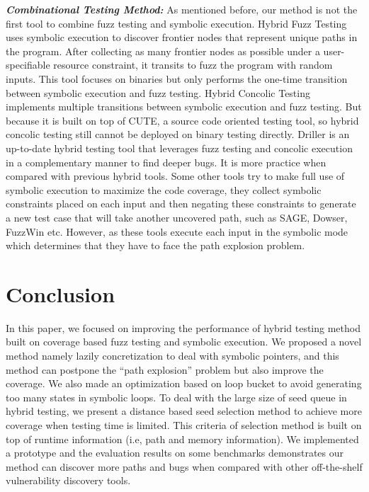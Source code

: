 \documentclass[a4paper]{article}
\begin{document}
\noindent\textit{\textbf{Combinational Testing Method:}}
As mentioned before, our method is not the first tool to combine fuzz testing and symbolic execution. Hybrid Fuzz Testing uses symbolic execution to discover frontier nodes that represent unique paths in the program. After collecting as many frontier nodes as possible under a user-specifiable resource constraint, it transits to fuzz the program with random inputs. This tool focuses on binaries but only performs the one-time transition between symbolic execution and fuzz testing. Hybrid Concolic Testing implements multiple transitions between symbolic execution and fuzz testing. But because it is built on top of CUTE, a source code oriented testing tool, so hybrid concolic testing still cannot be deployed on binary testing directly. Driller is an up-to-date hybrid testing tool that leverages fuzz testing and concolic execution in a complementary manner to find deeper bugs. It is more practice when compared with previous hybrid tools. Some other tools try to make full use of symbolic execution to maximize the code coverage, they collect symbolic constraints placed on each input and then negating these constraints to generate a new test case that will take another uncovered path, such as SAGE, Dowser, FuzzWin etc. However, as these tools execute each input in the symbolic mode which determines that they have to face the path explosion problem. 

\section{Conclusion} \label{sec:conclusion}
In this paper, we focused on improving the performance of hybrid testing method built on coverage based fuzz testing and symbolic execution. We proposed a novel method namely lazily concretization to deal with symbolic pointers, and this method can postpone the ``path explosion'' problem but also improve the coverage. We also made an optimization based on loop bucket to avoid generating too many states in symbolic loops. To deal with the large size of seed queue in hybrid testing, we present a distance based seed selection method to achieve more coverage when testing time is limited. This criteria of selection method is built on top of runtime information (i.e, path and memory information). We implemented a prototype and the evaluation results on some benchmarks demonstrates our method can discover more paths and bugs when compared with other off-the-shelf vulnerability discovery tools.



\end{document}
